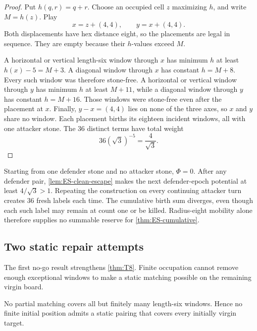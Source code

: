 \begin{proof}
Put $h(q,r)=q+r$.  Choose an occupied cell $z$ maximizing $h$, and write
$M=h(z)$.  Play
\[
 x=z+(4,4),\qquad y=x+(4,4).
\]
Both displacements have hex distance eight, so the placements are legal in
sequence.  They are empty because their $h$-values exceed $M$.

A horizontal or vertical length-six window through $x$ has minimum $h$ at
least $h(x)-5=M+3$.  A diagonal window through $x$ has constant
$h=M+8$.  Every such window was therefore stone-free.  A horizontal or
vertical window through $y$ has minimum $h$ at least $M+11$, while a diagonal
window through $y$ has constant $h=M+16$.  Those windows were stone-free even
after the placement at $x$.  Finally, $y-x=(4,4)$ lies on none of the three
axes, so $x$ and $y$ share no window.  Each placement births its eighteen
incident windows, all with one attacker stone.  The $36$ distinct terms have
total weight
\[
 36(\sqrt3)^{-5}=\frac4{\sqrt3}.
\]
\end{proof}

Starting from one defender stone and no attacker stone, $\Phi=0$.  After any
defender pair, \cref{lem:ES-clean-escape} makes the next defender-epoch
potential at least $4/\sqrt3>1$.  Repeating the construction on every
continuing attacker turn creates 36 fresh labels each time.  The cumulative
birth sum diverges, even though each such label may remain at count one or be
killed.  Radius-eight mobility alone therefore supplies no summable reserve
for \cref{thm:ES-cumulative}.

\subsection{Two static repair attempts}

The first no-go result strengthens \cref{thm:T8}.  Finite occupation cannot
remove enough exceptional windows to make a static matching possible on the
remaining virgin board.

\begin{proposition}
\label{prop:ES-no-static-pairing}
No partial matching covers all but finitely many length-six windows.  Hence no
finite initial position admits a static pairing that covers every initially
virgin target.
\end{proposition}

